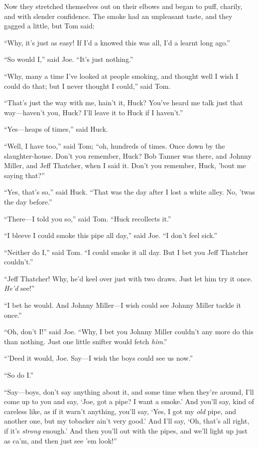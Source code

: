 \documentclass{book}
\begin{document}
Now they stretched themselves out on their elbows and began to puff, charily, and with slender confidence. The smoke had an unpleasant taste, and they gagged a little, but Tom said:

“Why, it’s just as easy! If I’d a knowed this was all, I’d a learnt long ago.”

“So would I,” said Joe. “It’s just nothing.”

“Why, many a time I’ve looked at people smoking, and thought well I wish I could do that; but I never thought I could,” said Tom.

“That’s just the way with me, hain’t it, Huck? You’ve heard me talk just that way—haven’t you, Huck? I’ll leave it to Huck if I haven’t.”

“Yes—heaps of times,” said Huck.

“Well, I have too,” said Tom; “oh, hundreds of times. Once down by the slaughter-house. Don’t you remember, Huck? Bob Tanner was there, and Johnny Miller, and Jeff Thatcher, when I said it. Don’t you remember, Huck, ’bout me saying that?”

“Yes, that’s so,” said Huck. “That was the day after I lost a white alley. No, ’twas the day before.”

“There—I told you so,” said Tom. “Huck recollects it.”

“I bleeve I could smoke this pipe all day,” said Joe. “I don’t feel sick.”

“Neither do I,” said Tom. “I could smoke it all day. But I bet you Jeff Thatcher couldn’t.”

“Jeff Thatcher! Why, he’d keel over just with two draws. Just let him try it once. \emph{He’d} see!”

“I bet he would. And Johnny Miller—I wish could see Johnny Miller tackle it once.”

“Oh, don’t I!” said Joe. “Why, I bet you Johnny Miller couldn’t any more do this than nothing. Just one little snifter would fetch \emph{him}.”

“’Deed it would, Joe. Say—I wish the boys could see us now.”

“So do I.”

“Say—boys, don’t say anything about it, and some time when they’re around, I’ll come up to you and say, ‘Joe, got a pipe? I want a smoke.’ And you’ll say, kind of careless like, as if it warn’t anything, you’ll say, ‘Yes, I got my \emph{old} pipe, and another one, but my tobacker ain’t very good.’ And I’ll say, ‘Oh, that’s all right, if it’s \emph{strong} enough.’ And then you’ll out with the pipes, and we’ll light up just as ca’m, and then just see ’em look!”
\end{document}
